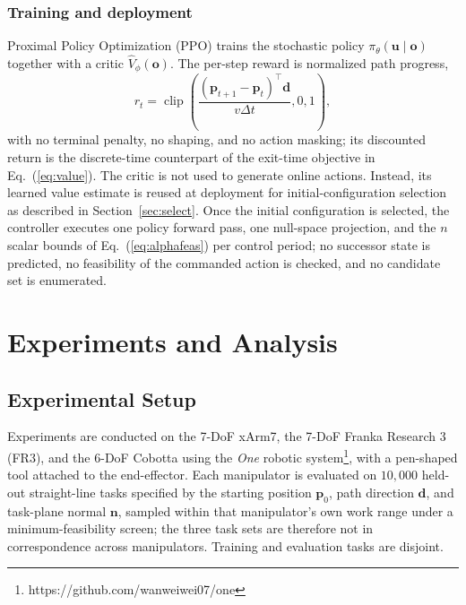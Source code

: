 \documentclass[journal, twoside]{IEEEtran}
\begin{document}
\subsubsection{Training and deployment}

Proximal Policy Optimization (PPO) trains the stochastic policy
$\pi_{\theta}(\mathbf{u}\mid\mathbf{o})$ together with a critic
$\widehat{V}_{\phi}(\mathbf{o})$. The per-step reward is normalized path
progress,
\begin{equation}
\label{eq:reward}
r_t
=
\operatorname{clip}\!\left(
\frac{
(\mathbf{p}_{t+1}-\mathbf{p}_{t})^{\top}\mathbf{d}
}{
v\Delta t
},
0,1
\right),
\end{equation}
with no terminal penalty, no shaping, and no action masking; its
discounted return is the discrete-time counterpart of the exit-time
objective in Eq.~(\ref{eq:value}). The critic is not used to generate
online actions. Instead, its learned value estimate is reused at
deployment for initial-configuration selection as described in
Section~\ref{sec:select}. Once the initial configuration is selected, the
controller executes one policy forward pass, one null-space projection,
and the $n$ scalar bounds of Eq.~(\ref{eq:alphafeas}) per control period;
no successor state is predicted, no feasibility of the commanded action is
checked, and no candidate set is enumerated.


\section{Experiments and Analysis}
\label{sec:setup}

\subsection{Experimental Setup}

Experiments are conducted on the 7-DoF xArm7, the 7-DoF Franka Research 3
(FR3), and the 6-DoF Cobotta using the \textit{One} robotic
system\footnote{https://github.com/wanweiwei07/one}, with a pen-shaped
tool attached to the end-effector. Each manipulator is evaluated on
$10{,}000$ held-out straight-line tasks specified by the starting position
$\mathbf{p}_0$, path direction $\mathbf{d}$, and task-plane normal
$\mathbf{n}$, sampled within that manipulator's own work range under a
minimum-feasibility screen; the three task sets are therefore not in
correspondence across manipulators. Training and evaluation tasks are
disjoint.
\end{document}
